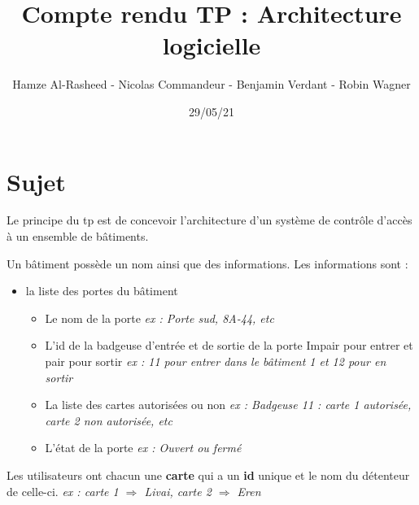 \documentclass[a4paper,10pt]{article}
\title{Compte rendu TP : Architecture logicielle}
\date{29/05/21}
\author{Hamze Al-Rasheed - Nicolas Commandeur - Benjamin Verdant - Robin Wagner}
\begin{document}
    \maketitle
    \newpage
    \tableofcontents
    \newpage
    
    \section{Sujet}
        Le principe du tp est de concevoir l'architecture d'un système de contrôle d'accès à un ensemble de bâtiments.
    
        Un bâtiment possède un nom ainsi que des informations. Les informations sont :
        \begin{itemize}
            \item la liste des portes du bâtiment
            \begin{itemize}
                \item Le nom de la porte    \newline
                \textit{ex : Porte sud, 8A-44, etc}
                \item L'id de la badgeuse d'entrée et de sortie de la porte
                \newline
                Impair pour entrer et pair pour sortir \newline
                \textit{ex : 11 pour entrer dans le bâtiment 1 et 12 pour en sortir}
                \item La liste des cartes autorisées ou non 
                \newline
                \textit{ex : Badgeuse 11 : carte 1 autorisée, carte 2 non autorisée, etc}
                \item L'état de la porte
                \newline
                \textit{ex : Ouvert ou fermé}
            \end{itemize}
        \end{itemize}
        
        Les utilisateurs ont chacun une \textbf{carte} qui a un \textbf{id} unique et le nom du détenteur de celle-ci.
        \newline
        \textit{ex : carte 1 $\Rightarrow$ Livai, carte 2 $\Rightarrow$ Eren }
\end{document}
